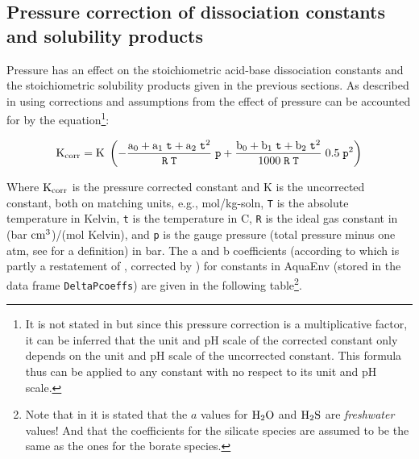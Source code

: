 \documentclass[a4paper]{article}
\begin{document}
\subsection{Pressure correction of dissociation constants and solubility products}
Pressure has an effect on the stoichiometric acid-base dissociation constants  and the stoichiometric solubility products given in the  previous sections. As described in \citet[p. 675]{Millero1995} using corrections and assumptions from \citet[p. A-7]{Lewis1998} the effect of pressure can be accounted for by the equation\footnote{It is not stated in \citet{Millero1995} but since this pressure correction is a multiplicative factor, it can be inferred that the unit and pH scale of the corrected constant only depends on the unit and pH scale of the uncorrected constant. This formula thus can be applied to any constant with no respect to its unit and pH scale.}:

\begin{equation}
\rm K_{corr} = K \; \left(- \frac{a_0 + a_1 \; \mbox{\texttt{t}} + a_2 \; \mbox{\texttt{t}}^2}{\mbox{\texttt{R}}\;\mbox{\texttt{T}}} \; \mbox{\texttt{p}} + \frac{b_0 + b_1 \; \mbox{\texttt{t}} + b_2 \; \mbox{\texttt{t}}^2}{1000\;\mbox{\texttt{R}}\;\mbox{\texttt{T}}} \; 0.5 \; \mbox{\texttt{p}}^2\right)
\end{equation}

\noindent
Where $\rm K_{corr}$ is the pressure corrected constant and K is the uncorrected constant, both on matching units, e.g., mol/kg-soln, \texttt{T} is the absolute temperature in Kelvin, \texttt{t} is the temperature in \textdegree$ $C, \texttt{R} is the ideal gas constant in (bar $\rm cm^3$)/(mol Kelvin), and \texttt{p} is the gauge pressure (total pressure minus one atm, see \cite{Feistel2008} for a definition) in bar. The a and b coefficients (according to \citet{Millero1995} which is partly a restatement of \citet{Millero1979}, corrected by \citet{Lewis1998}) for constants in \textsf{AquaEnv} (stored in the data frame \texttt{DeltaPcoeffs}) are given in the following table\footnote{Note that in \citet{Lewis1998} it is stated that the $a$ values for $\rm H_2O$ and $\rm H_2S$ are \textit{freshwater} values! And that the coefficients for the silicate species are assumed to be the same as the ones for the borate species.}.
\end{document}
